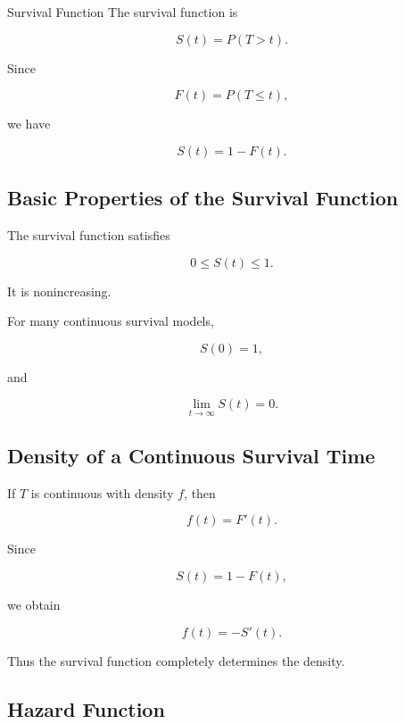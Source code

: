 \begin{definitionbox}{Survival Function}
The survival function is

\[
\boxed{
S(t)
=
P(T>t).
}
\]
\end{definitionbox}

Since

\[
F(t)
=
P(T\leq t),
\]

we have

\[
\boxed{
S(t)
=
1-F(t).
}
\]

\subsection{Basic Properties of the Survival Function}
\label{subsec:survival-function-properties}

The survival function satisfies

\[
\boxed{
0\leq S(t)\leq1.
}
\]

It is nonincreasing.

For many continuous survival models,

\[
\boxed{
S(0)=1,
}
\]

and

\[
\boxed{
\lim_{t\to\infty}
S(t)
=
0.
}
\]

\subsection{Density of a Continuous Survival Time}
\label{subsec:survival-density}

If \(T\) is continuous with density \(f\), then

\[
\boxed{
f(t)
=
F'(t).
}
\]

Since

\[
S(t)
=
1-F(t),
\]

we obtain

\[
\boxed{
f(t)
=
-
S'(t).
}
\]

Thus the survival function completely determines the density.

\subsection{Hazard Function}
\label{subsec:hazard-function}

